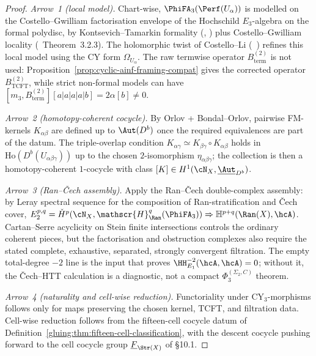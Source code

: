 \begin{proof}
\emph{Arrow~1 (local model).} Chart-wise,
$\PhiFA_{3}(\Perf(U_\alpha))$ is modelled on the
Costello--Gwilliam factorisation envelope of the Hochschild
$E_{3}$-algebra on the formal polydisc, by
Kontsevich--Tamarkin formality (\cite{Kontsevich1999},
\cite{Tamarkin2007}) plus Costello--Gwilliam locality
(\cite{CostelloGwilliam2017}~Theorem~3.2.3). The holomorphic twist
of Costello--Li (\cite{CostelloLi2016}~\cite{CostelloLi2020})
refines this local model using the CY form $\Omega_{U_{\alpha}}$.
The raw termwise operator \(B^{(2)}_{\mathrm{term}}\) is not used:
Proposition~\ref{prop:cyclic-ainf-framing-compat} gives the corrected
operator \(B^{(2)}_{\mathrm{TCFT}}\), while strict non-formal models can
have \([m_3,B^{(2)}_{\mathrm{term}}][a|a|a|a|b]=2\alpha[b]\neq0\).

\emph{Arrow~2 (homotopy-coherent cocycle).} By Orlov + Bondal--Orlov,
pairwise FM-kernels $K_{\alpha\beta}$ are defined up to
$\Aut(D^{b})$ once the required equivalences are part of the datum. The
triple-overlap condition
$K_{\alpha\gamma}\simeq K_{\beta\gamma}\circ K_{\alpha\beta}$ holds
in $\mathrm{Ho}(D^{b}(U_{\alpha\beta\gamma}))$ up to the chosen
$2$-isomorphism $\eta_{\alpha\beta\gamma}$; the collection is then a
homotopy-coherent $1$-cocycle with class $[K]\in
H^{1}(\cN_{X},\underline{\Aut}_{D^{b}})$.

\emph{Arrow~3 (Ran--\v{C}ech assembly).} Apply the Ran--\v{C}ech
double-complex assembly: by Leray spectral sequence for the
composition of Ran-stratification and \v{C}ech cover,
$E_{2}^{p,q}=\check H^{p}(\cN_{X},\mathscr{H}^{q}_{\Ran}(\PhiFA_{3}))
\Rightarrow\mathbb{H}^{p+q}(\Ran(X),\hcA)$.
Cartan--Serre acyclicity on Stein finite intersections controls the
ordinary coherent pieces, but the factorisation and obstruction
complexes also require the stated complete, exhaustive, separated,
strongly convergent filtration. The empty total-degree \(-2\) line is
the input that proves
\(\HH^{-2}_{E_1}(\hcA,\hcA)=0\); without it, the \v{C}ech--HTT
calculation is a diagnostic, not a compact \(\Phi_3^{(\Sigma_2, C)}\)
theorem.

\emph{Arrow~4 (naturality and cell-wise reduction).} Functoriality
under CY$_{3}$-morphisms follows only for maps preserving the chosen
kernel, TCFT, and filtration data. Cell-wise reduction follows from the
fifteen-cell cocycle datum of
Definition~\ref{gluing:thm:fifteen-cell-classification}, with the
descent cocycle pushing forward to the cell cocycle group
$\underline{F}_{\Str(X)}$ of \S 10.1.
\end{proof}

